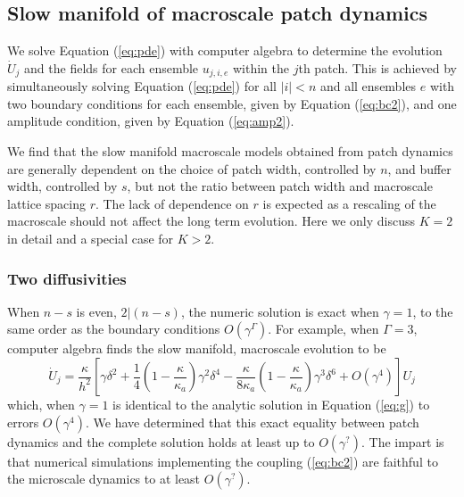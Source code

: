 \documentclass[12pt,a4paper]{article}
\begin{document}
\subsection{Slow manifold of macroscale patch dynamics}
\label{sec:results}
We solve Equation (\ref{eq:pde}) with computer algebra to determine the evolution $\dot{U}_j$ and the fields for each ensemble $u_{j,i,e}$ within the $j$th patch.  This is achieved by simultaneously solving Equation (\ref{eq:pde}) for all $|i|<n$ and all ensembles $e$ with two boundary conditions for each ensemble, given by Equation (\ref{eq:bc2}), and one amplitude condition, given by Equation (\ref{eq:amp2}).


We find that the slow manifold macroscale models obtained from patch dynamics are generally dependent on the choice of patch width, controlled by $n$, and buffer width, controlled by $s$, but not the ratio between patch width and macroscale lattice spacing $r$. The lack of dependence on $r$ is expected as a rescaling of the macroscale should not affect the long term evolution.  Here we only discuss $K=2$ in detail and a special case for $K>2$.
\subsubsection{Two diffusivities}

When $n-s$ is even, $2|(n-s)$, the numeric solution is exact when $\gamma=1$, to the same order as the boundary conditions $O(\gamma^{\Gamma})$. For example, when $\Gamma=3$, computer algebra finds the slow manifold, macroscale evolution to be
\begin{equation}
\dot{U}_j=\frac{\kappa}{h^2}\left[\gamma\delta^2+\frac{1}{4}\left(1-\frac{\kappa}{\kappa_a}\right)\gamma^2\delta^4-\frac{\kappa}{8\kappa_a}\left(1-\frac{\kappa}{\kappa_a}\right)\gamma^3\delta^6+O(\gamma^4)
\right]U_j
\end{equation}
which, when $\gamma=1$ is identical to the analytic solution in Equation (\ref{eq:g}) to errors $O(\gamma^4)$. We have determined that this exact equality between patch dynamics and the complete solution holds at least up to $O(\gamma^?)$. The impart is that numerical simulations implementing the coupling (\ref{eq:bc2}) are faithful to the microscale dynamics to at least $O(\gamma^?)$.
\end{document}
